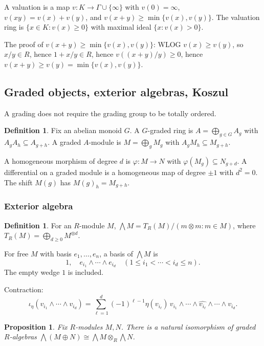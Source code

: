 \documentclass[12pt]{article}
\theoremstyle{plain}
\newtheorem{proposition}[thm]{Proposition}
\theoremstyle{definition}
\newtheorem{defn}[thm]{Definition} %
\begin{document}
A valuation is a map $v:K\to\Gamma\cup\{\infty\}$ with $v(0)=\infty$, $v(xy)=v(x)+v(y)$, and $v(x+y)\ge\min\{v(x),v(y)\}$. The valuation ring is $\{x\in K:v(x)\ge 0\}$ with maximal ideal $\{x:v(x)>0\}$.

The proof of $v(x+y)\ge\min\{v(x),v(y)\}$: WLOG $v(x)\ge v(y)$, so $x/y\in R$, hence $1+x/y\in R$, hence $v((x+y)/y)\ge 0$, hence $v(x+y)\ge v(y)=\min\{v(x),v(y)\}$.

\subsection{Graded objects, exterior algebras, Koszul}

A grading does not require the grading group to be totally ordered.

\begin{defn}
Fix an abelian monoid $G$. A $G$-graded ring is $A=\bigoplus_{g\in G}A_g$ with $A_gA_h\subseteq A_{g+h}$. A graded $A$-module is $M=\bigoplus_g M_g$ with $A_g M_h\subseteq M_{g+h}$.
\end{defn}

A homogeneous morphism of degree $d$ is $\varphi:M\to N$ with $\varphi(M_g)\subseteq N_{g+d}$. A differential on a graded module is a homogeneous map of degree $\pm 1$ with $d^2=0$. The shift $M(g)$ has $M(g)_h=M_{g+h}$.

\subsubsection*{Exterior algebra}

\begin{defn}
For an $R$-module $M$, $\bigwedge M=T_R(M)/(m\otimes m:m\in M)$, where $T_R(M)=\bigoplus_{d\ge 0}M^{\otimes d}$.
\end{defn}

For free $M$ with basis $e_1,\ldots,e_n$, a basis of $\bigwedge M$ is
\[
1,\quad e_{i_1}\wedge\cdots\wedge e_{i_d}\quad (1\le i_1<\cdots<i_d\le n).
\]
The empty wedge $1$ is included.

Contraction:
\[
\iota_\eta(v_{i_1}\wedge\cdots\wedge v_{i_d})=\sum_{\ell=1}^d(-1)^{\ell-1}\eta(v_{i_\ell})\,v_{i_1}\wedge\cdots\wedge\widehat{v_{i_\ell}}\wedge\cdots\wedge v_{i_d}.
\]

\begin{proposition}
Fix $R$-modules $M,N$. There is a natural isomorphism of graded $R$-algebras $\bigwedge(M\oplus N)\cong\bigwedge M\otimes_R\bigwedge N$.
\end{proposition}
\end{document}
